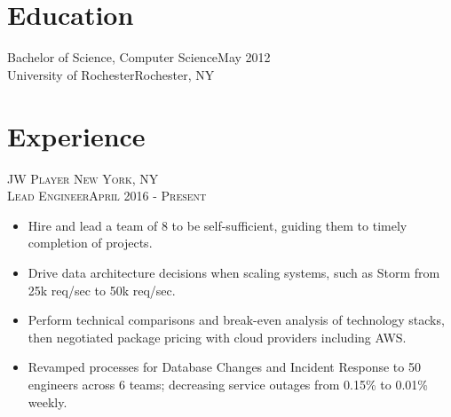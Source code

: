 \documentclass[oneside, final]{scrartcl}
\begin{document}
\begin{center}
 
\textsc{\LARGE{}}\\
\\

\section{Education}
Bachelor of Science, Computer Science\hfill May 2012\\
University of Rochester\hfill Rochester, NY\\

\section{Experience}
\textsc{JW Player \hfill New York, NY\\}
\textsc{Lead Engineer\hfill April 2016 - Present\\}
\begin{itemize}
    \vspace{-8pt}
	\setlength{\itemsep}{1pt}
	\setlength{\parskip}{0pt}
	\setlength{\parsep}{0pt}
	\setlength{\leftmargin}{-5mm}
	\item Hire and lead a team of 8 to be self-sufficient, guiding them to timely completion of projects.
	\item Drive data architecture decisions when scaling systems, such as Storm from 25k req/sec to 50k req/sec.
	\item Perform technical comparisons and break-even analysis of technology stacks, then negotiated package pricing with cloud providers including AWS.
	\item Revamped processes for Database Changes and Incident Response to 50 engineers across 6 teams; decreasing service outages from 0.15\% to 0.01\% weekly.
\end{itemize}


\end{center}
\end{document}
